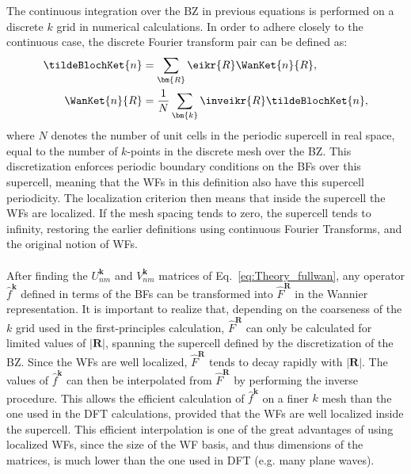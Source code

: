 The continuous integration over the BZ in previous equations is performed on a discrete $k$ grid in numerical calculations.
In order to adhere closely to the continuous case, the discrete Fourier transform pair can be defined as:
\begin{align}
	\tildeBlochKet{n} &= \sum_{\bm{R}} \eikr{R} \WanKet{n}{R},\label{eq:Theory_wantok}\\
	\WanKet{n}{R} &= \frac{1}{N}\sum_{\bm{k}} \inveikr{R} \tildeBlochKet{n},
\end{align}
where $N$ denotes the number of unit cells in the periodic supercell in real space, equal to the number of $k$-points in the discrete mesh over the BZ.
This discretization enforces periodic boundary conditions on the BFs over this supercell, meaning that the WFs in this definition also have this supercell periodicity.
The localization criterion then means that inside the supercell the WFs are localized.
If the mesh spacing tends to zero, the supercell tends to infinity, restoring the earlier definitions using continuous Fourier Transforms, and the original notion of WFs.
\\\\
After finding the $U^{\bm{k}}_{nm}$ and $V^{\bm{k}}_{nm}$ matrices of Eq.~\eqref{eq:Theory_fullwan}, any operator $\hat{f}^{\bm{k}}$ defined in terms of the BFs can be transformed into $\hat{F}^{\bm{R}}$ in the Wannier representation.
It is important to realize that, depending on the coarseness of the $k$ grid used in the first-principles calculation, $\hat{F}^{\bm{R}}$ can only be calculated for limited values of $|\bm{R}|$, spanning the supercell defined by the discretization of the BZ.
Since the WFs are well localized, $\hat{F}^{\bm{R}}$ tends to decay rapidly with $|\bm{R}|$.
The values of $\hat{f}^{\bm{k}}$ can then be interpolated from $\hat{F}^{\bm{R}}$ by performing the inverse procedure.
This allows the efficient calculation of $\hat{f}^{\bm{k}}$ on a finer $k$ mesh than the one used in the DFT calculations, provided that the WFs are well localized inside the supercell.
This efficient interpolation is one of the great advantages of using localized WFs, since the size of the WF basis, and thus dimensions of the matrices, is much lower than the one used in DFT (e.g. many plane waves).


